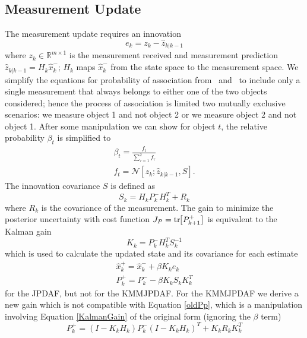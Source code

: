 \documentclass[letterpaper, 10pt, conference]{ieeeconf}
\newcommand{\bracket}[1]{\ensuremath{\left[ #1 \right]}}
\newcommand{\tr}[1]{\mathrm{tr}\ensuremath{\negthickspace\bracket{#1}}}
\renewcommand{\Re}{\ensuremath{\mathbb{R}}}
\begin{document}
\subsection{Measurement Update} The measurement update requires an innovation
\begin{equation}
\label{innovation}
e_{k}=z_{k}-\hat z_{k|k-1}
\end{equation}
where $z_{k}\in\Re^{m\times1}$ is the measurement received and measurement prediction $\hat z_{k|k-1}=H_{k}\hat{x}_{k}^{-}$; $H_{k}$ maps $\hat{x}_{k}^{-}$ from the state space to the measurement space.%
We simplify the equations for probability of association from~\cite{JPDAF1} and~\cite{TrackDataAssoc} to include only a single measurement that always belongs to either one of the two objects considered; hence the process of association is limited two mutually exclusive scenarios: we measure object 1 and not object 2 or we measure object 2 and not object 1. After some manipulation we can show for object $t$, the relative probability $\beta_t$ is simplified to
\begin{gather}
\beta_t=\frac{f_t}{\displaystyle\sum\limits_{\tau=1}^2 f_{\tau}} \\
f_t=\mathcal{N}[z_{k};\hat z_{k|k-1},S].
\end{gather}
The innovation covariance $S$ is defined as
\begin{equation}
S_k=H_{k}P_{k}^{-}H_{k}^T+R_k
\end{equation}
where $R_k$ is the covariance of the measurement. The gain to minimize the posterior uncertainty with cost function $J_P=\tr{P_{k+1}^{+}}$ is equivalent to the Kalman gain
\begin{equation}
\label{KalmanGain}
K_{k}=P_{k}^{-}H_{k}^TS_k^{-1}
\end{equation}
which is used to calculate the updated state and its covariance for each estimate
\begin{gather}
\label{xhatp}
\hat{x}_{k}^{+}=\hat{x}_{k}^{-}+\beta K_{k}e_{k} \\
\label{oldPp}
P_{k}^{+}=P^-_{k}-\beta K_{k}S_kK_{k}^{T}
\end{gather}
for the JPDAF, but not for the KMMJPDAF. For the KMMJPDAF we derive a new gain which is not compatible with Equation \ref{oldPp}, which is a manipulation involving Equation \ref{KalmanGain} of the original form (ignoring the $\beta$ term)
\begin{equation}
\label{genPp}
P_{k}^{+}=(I-K_{k}H_{k})P_{k}^{-}(I-K_{k}H_{k})^T+K_{k}R_kK_{k}^T
\end{equation}
\end{document}
